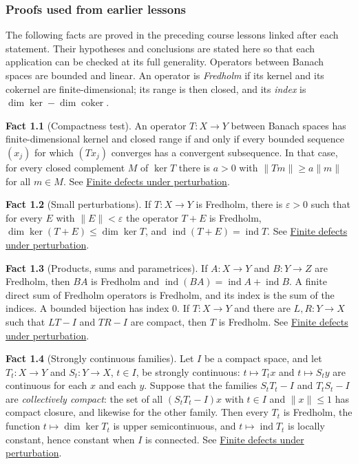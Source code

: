 \documentclass[
  11pt,
]{article}
\begin{document}
\subsubsection{Proofs used from earlier
lessons}\label{proofs-used-from-earlier-lessons}

The following facts are proved in the preceding course lessons linked
after each statement. Their hypotheses and conclusions are stated here
so that each application can be checked at its full generality.
Operators between Banach spaces are bounded and linear. An operator is
\emph{Fredholm} if its kernel and its cokernel are finite-dimensional;
its range is then closed, and its \emph{index} is
\(\dim\ker-\dim\operatorname{coker}\).

\textbf{Fact 1.1} (Compactness test). An operator \(T:X\to Y\) between
Banach spaces has finite-dimensional kernel and closed range if and only
if every bounded sequence \((x_j)\) for which \((Tx_j)\) converges has a
convergent subsequence. In that case, for every closed complement \(M\)
of \(\ker T\) there is \(a>0\) with \(\|Tm\|\ge a\|m\|\) for all
\(m\in M\). See \href{fredholm-stability.pdf}{Finite defects under
perturbation}.

\textbf{Fact 1.2} (Small perturbations). If \(T:X\to Y\) is Fredholm,
there is \(\varepsilon>0\) such that for every \(E\) with
\(\|E\|<\varepsilon\) the operator \(T+E\) is Fredholm,
\(\dim\ker(T+E)\le\dim\ker T\), and
\(\operatorname{ind}(T+E)=\operatorname{ind}T\). See
\href{fredholm-stability.pdf}{Finite defects under perturbation}.

\textbf{Fact 1.3} (Products, sums and parametrices). If \(A:X\to Y\) and
\(B:Y\to Z\) are Fredholm, then \(BA\) is Fredholm and
\(\operatorname{ind}(BA)=\operatorname{ind}A+\operatorname{ind}B\). A
finite direct sum of Fredholm operators is Fredholm, and its index is
the sum of the indices. A bounded bijection has index \(0\). If
\(T:X\to Y\) and there are \(L,R:Y\to X\) such that \(LT-I\) and
\(TR-I\) are compact, then \(T\) is Fredholm. See
\href{fredholm-stability.pdf}{Finite defects under perturbation}.

\textbf{Fact 1.4} (Strongly continuous families). Let \(I\) be a compact
space, and let \(T_t:X\to Y\) and \(S_t:Y\to X\), \(t\in I\), be
strongly continuous: \(t\mapsto T_tx\) and \(t\mapsto S_ty\) are
continuous for each \(x\) and each \(y\). Suppose that the families
\(S_tT_t-I\) and \(T_tS_t-I\) are \emph{collectively compact}: the set
of all \((S_tT_t-I)x\) with \(t\in I\) and \(\|x\|\le1\) has compact
closure, and likewise for the other family. Then every \(T_t\) is
Fredholm, the function \(t\mapsto\dim\ker T_t\) is upper semicontinuous,
and \(t\mapsto\operatorname{ind}T_t\) is locally constant, hence
constant when \(I\) is connected. See
\href{fredholm-stability.pdf}{Finite defects under perturbation}.
\end{document}
